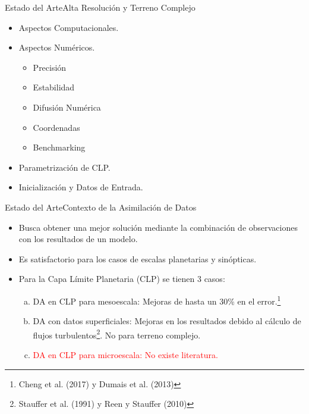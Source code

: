 \documentclass[mathserif,10pt]{beamer}
\begin{document}
\begin{frame}{Estado del Arte}{Alta Resolución y Terreno Complejo}
	\begin{itemize}
		\item Aspectos Computacionales.
		\item Aspectos Numéricos.
		\begin{itemize}
			\item Precisión
			\item Estabilidad
			\item Difusión Numérica
			\item Coordenadas
			\item Benchmarking
		\end{itemize}
		\item Parametrización de CLP.
		\item Inicialización y Datos de Entrada.
	\end{itemize}
\end{frame}

\begin{frame}{Estado del Arte}{Contexto de la Asimilación de Datos}
	\begin{itemize}
		\item Busca obtener una mejor solución mediante la combinación de observaciones con los resultados de un modelo.
		\item Es satisfactorio para los casos de escalas planetarias y sinópticas.
		\item Para la Capa Límite Planetaria (CLP) se tienen 3 casos:
		\begin{enumerate}[a.]
			\item DA en CLP para mesoescala: Mejoras de hasta un 30\% en el error.\footnote{Cheng et al. (2017) y Dumais et al. (2013)}
			\item DA con datos superficiales: Mejoras en los resultados debido al cálculo de flujos turbulentos\footnote{Stauffer et al. (1991) y Reen y Stauffer (2010)}. No para terreno complejo.
			\item \textcolor{red}{DA en CLP para microescala: No existe literatura.}
		\end{enumerate}
	\end{itemize}
\end{frame}












\end{document}
